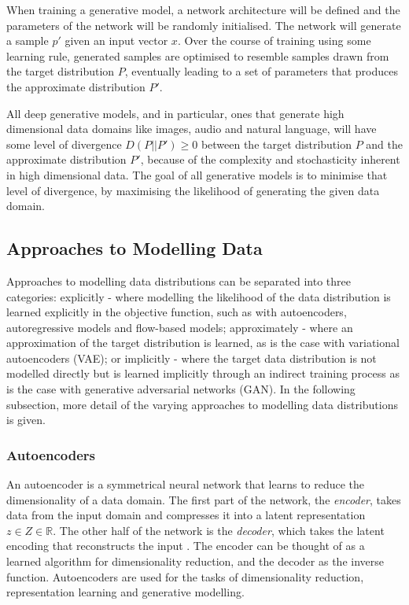 When training a generative model, a network architecture will be defined and the parameters of the network will be randomly initialised.
The network will generate a sample $p'$ given an input vector $x$. 
Over the course of training using some learning rule, generated samples are optimised to resemble samples drawn from the target distribution $P$, eventually leading to a set of parameters that produces the approximate distribution $P'$.

All deep generative models, and in particular, ones that generate high dimensional data domains like images, audio and natural language, will have some level of divergence $D(P||P') \geq 0$ between the target distribution $P$ and the approximate distribution $P'$, because of the complexity and stochasticity inherent in high dimensional data. 
The goal of all generative models is to minimise that level of divergence, by maximising the likelihood of generating the given data domain.

\subsection{Approaches to Modelling Data}

Approaches to modelling data distributions can be separated into three categories: explicitly - where modelling the likelihood of the data distribution is learned explicitly in the objective function, such as with autoencoders, autoregressive models and flow-based models; approximately - where an approximation of the target distribution is learned, as is the case with variational autoencoders (VAE); or implicitly - where the target data distribution is not modelled directly but is learned implicitly through an indirect training process as is the case with generative adversarial networks (GAN).
In the following subsection, more detail of the varying approaches to modelling data distributions is given. 

\subsubsection{Autoencoders}

An autoencoder is a symmetrical neural network that learns to reduce the dimensionality of a data domain.
The first part of the network, the \textit{encoder}, takes data from the input domain and compresses it into a latent representation $z \in Z \in \mathbb{R}$. 
The other half of the network is the \textit{decoder}, which takes the latent encoding that reconstructs the input \citep{kramer1991nonlinear}. 
The encoder can be thought of as a learned algorithm for dimensionality reduction, and the decoder as the inverse function. 
Autoencoders are used for the tasks of dimensionality reduction, representation learning and generative modelling.

